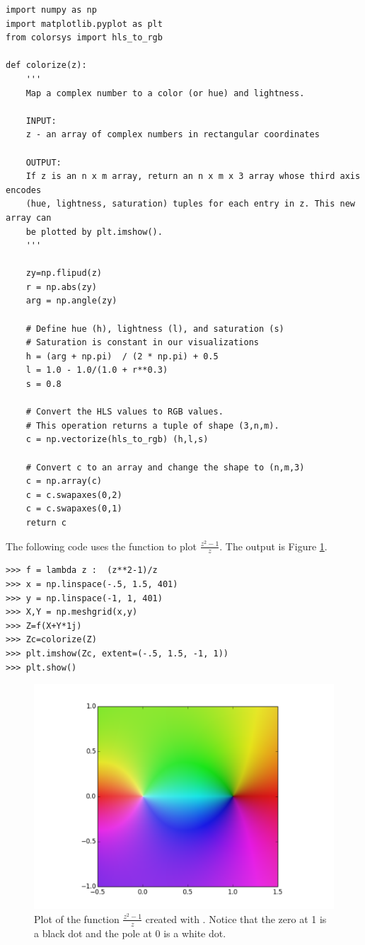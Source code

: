 \begin{lstlisting}
import numpy as np
import matplotlib.pyplot as plt
from colorsys import hls_to_rgb

def colorize(z):
    '''
    Map a complex number to a color (or hue) and lightness.

    INPUT:
    z - an array of complex numbers in rectangular coordinates

    OUTPUT:
    If z is an n x m array, return an n x m x 3 array whose third axis encodes
    (hue, lightness, saturation) tuples for each entry in z. This new array can
    be plotted by plt.imshow().
    '''

    zy=np.flipud(z)
    r = np.abs(zy)
    arg = np.angle(zy)

    # Define hue (h), lightness (l), and saturation (s)
    # Saturation is constant in our visualizations
    h = (arg + np.pi)  / (2 * np.pi) + 0.5
    l = 1.0 - 1.0/(1.0 + r**0.3)
    s = 0.8

    # Convert the HLS values to RGB values.
    # This operation returns a tuple of shape (3,n,m).
    c = np.vectorize(hls_to_rgb) (h,l,s)

    # Convert c to an array and change the shape to (n,m,3)
    c = np.array(c)
    c = c.swapaxes(0,2)
    c = c.swapaxes(0,1)
    return c
\end{lstlisting}

The following code uses the  function to plot  $\frac{z^2 - 1}{z}$. The output is Figure \ref{fig:example}.

\begin{lstlisting}
>>> f = lambda z :  (z**2-1)/z
>>> x = np.linspace(-.5, 1.5, 401)
>>> y = np.linspace(-1, 1, 401)
>>> X,Y = np.meshgrid(x,y)
>>> Z=f(X+Y*1j)
>>> Zc=colorize(Z)
>>> plt.imshow(Zc, extent=(-.5, 1.5, -1, 1))
>>> plt.show()
\end{lstlisting}

\begin{figure}
\includegraphics[width=\textwidth]{figures/example.pdf}
\caption{Plot of the function $\frac{z^2 - 1}{z}$ created with .
Notice that the zero at 1 is a black dot and the pole at 0 is a white dot.}
\label{fig:example}
\end{figure}

